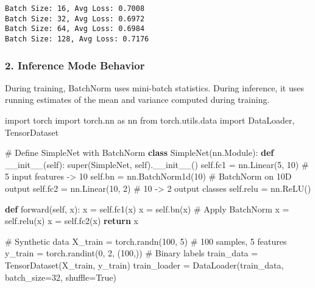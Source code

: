 \documentclass[
  letterpaper,
  DIV=11,
  numbers=noendperiod]{scrreprt}
\newenvironment{Shaded}{\begin{snugshade}}{\end{snugshade}}
\newcommand{\BuiltInTok}[1]{\textcolor[rgb]{0.00,0.23,0.31}{#1}}
\newcommand{\CommentTok}[1]{\textcolor[rgb]{0.37,0.37,0.37}{#1}}
\newcommand{\ControlFlowTok}[1]{\textcolor[rgb]{0.00,0.23,0.31}{\textbf{#1}}}
\newcommand{\DecValTok}[1]{\textcolor[rgb]{0.68,0.00,0.00}{#1}}
\newcommand{\FunctionTok}[1]{\textcolor[rgb]{0.28,0.35,0.67}{#1}}
\newcommand{\ImportTok}[1]{\textcolor[rgb]{0.00,0.46,0.62}{#1}}
\newcommand{\KeywordTok}[1]{\textcolor[rgb]{0.00,0.23,0.31}{\textbf{#1}}}
\newcommand{\NormalTok}[1]{\textcolor[rgb]{0.00,0.23,0.31}{#1}}
\newcommand{\OperatorTok}[1]{\textcolor[rgb]{0.37,0.37,0.37}{#1}}
\newcommand{\VariableTok}[1]{\textcolor[rgb]{0.07,0.07,0.07}{#1}}
\begin{document}
\begin{verbatim}
Batch Size: 16, Avg Loss: 0.7008
Batch Size: 32, Avg Loss: 0.6972
Batch Size: 64, Avg Loss: 0.6984
Batch Size: 128, Avg Loss: 0.7176
\end{verbatim}

\subsubsection{2. Inference Mode
Behavior}\label{inference-mode-behavior}

During training, BatchNorm uses mini-batch statistics. During inference,
it uses running estimates of the mean and variance computed during
training.

\begin{Shaded}
\begin{Highlighting}[]
\ImportTok{import}\NormalTok{ torch}
\ImportTok{import}\NormalTok{ torch.nn }\ImportTok{as}\NormalTok{ nn}
\ImportTok{from}\NormalTok{ torch.utils.data }\ImportTok{import}\NormalTok{ DataLoader, TensorDataset}

\CommentTok{\# Define SimpleNet with BatchNorm}
\KeywordTok{class}\NormalTok{ SimpleNet(nn.Module):}
    \KeywordTok{def} \FunctionTok{\_\_init\_\_}\NormalTok{(}\VariableTok{self}\NormalTok{):}
        \BuiltInTok{super}\NormalTok{(SimpleNet, }\VariableTok{self}\NormalTok{).}\FunctionTok{\_\_init\_\_}\NormalTok{()}
        \VariableTok{self}\NormalTok{.fc1 }\OperatorTok{=}\NormalTok{ nn.Linear(}\DecValTok{5}\NormalTok{, }\DecValTok{10}\NormalTok{)  }\CommentTok{\# 5 input features {-}\textgreater{} 10}
        \VariableTok{self}\NormalTok{.bn }\OperatorTok{=}\NormalTok{ nn.BatchNorm1d(}\DecValTok{10}\NormalTok{)  }\CommentTok{\# BatchNorm on 10D output}
        \VariableTok{self}\NormalTok{.fc2 }\OperatorTok{=}\NormalTok{ nn.Linear(}\DecValTok{10}\NormalTok{, }\DecValTok{2}\NormalTok{)  }\CommentTok{\# 10 {-}\textgreater{} 2 output classes}
        \VariableTok{self}\NormalTok{.relu }\OperatorTok{=}\NormalTok{ nn.ReLU()}

    \KeywordTok{def}\NormalTok{ forward(}\VariableTok{self}\NormalTok{, x):}
\NormalTok{        x }\OperatorTok{=} \VariableTok{self}\NormalTok{.fc1(x)}
\NormalTok{        x }\OperatorTok{=} \VariableTok{self}\NormalTok{.bn(x)  }\CommentTok{\# Apply BatchNorm}
\NormalTok{        x }\OperatorTok{=} \VariableTok{self}\NormalTok{.relu(x)}
\NormalTok{        x }\OperatorTok{=} \VariableTok{self}\NormalTok{.fc2(x)}
        \ControlFlowTok{return}\NormalTok{ x}

\CommentTok{\# Synthetic data}
\NormalTok{X\_train }\OperatorTok{=}\NormalTok{ torch.randn(}\DecValTok{100}\NormalTok{, }\DecValTok{5}\NormalTok{)  }\CommentTok{\# 100 samples, 5 features}
\NormalTok{y\_train }\OperatorTok{=}\NormalTok{ torch.randint(}\DecValTok{0}\NormalTok{, }\DecValTok{2}\NormalTok{, (}\DecValTok{100}\NormalTok{,))  }\CommentTok{\# Binary labels}
\NormalTok{train\_data }\OperatorTok{=}\NormalTok{ TensorDataset(X\_train, y\_train)}
\NormalTok{train\_loader }\OperatorTok{=}\NormalTok{ DataLoader(train\_data, batch\_size}\OperatorTok{=}\DecValTok{32}\NormalTok{, shuffle}\OperatorTok{=}\VariableTok{True}\NormalTok{)}


\end{Highlighting}
\end{Shaded}
\end{document}
